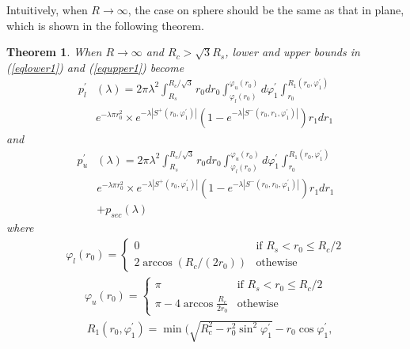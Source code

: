 \documentclass[journal, twoside]{IEEEtran}
\newtheorem{theorem}{Theorem}
\begin{document}
Intuitively, when $R \to \infty$, the case on sphere should be the same as 
that in plane, which is shown in the following theorem.

\begin{theorem} \label{theo2}
When $R \to \infty$ and $R_c > \sqrt{3}R_s$, lower and upper bounds in \emph{(\ref{eqlower1})} and \emph{(\ref{equpper1})}
become 
	\begin{equation} \label{eqlower2}
	  \begin{split}
	    p_l^\prime &(\lambda) =  2\pi\lambda ^2 \int_{R_s}^{R_c/\sqrt{3}} r_0 dr_0 \int_{\varphi_l(r_0)}^{\varphi_u(r_0)} d\varphi_1^\prime \int_{r_0}^{R_1(r_0, \varphi_1^\prime)} \\
	    	  	    & e^{-\lambda \pi r_0^2} \times e^{-\lambda |S^+(r_0, \varphi_1^\prime)|}
	    	  	    (1 - e^{-\lambda |S^-(r_0, r_1, \varphi_1^\prime)|})r_1 dr_1
	  \end{split}
	\end{equation}
	and 
	\begin{equation} \label{equpper2}
	  \begin{split}
	    p_u^\prime &(\lambda) =  2\pi\lambda ^2 \int_{R_s}^{R_c/\sqrt{3}} r_0 dr_0 \int_{\varphi_l(r_0)}^{\varphi_u(r_0)} d\varphi_1^\prime \int_{r_0}^{R_1(r_0, \varphi_1^\prime)} \\
	    	  	    & e^{-\lambda \pi r_0^2} \times e^{-\lambda |S^+(r_0, \varphi_1^\prime)|} (1 - e^{-\lambda |S^-(r_0, r_0, \varphi_1^\prime)|})r_1 dr_1\\
	    & + p_{sec}(\lambda)
	    \end{split}
	\end{equation}
	where 
	\begin{eqnarray} \label{eqphil}
	  \varphi_l(r_0) = 
	  \begin{cases}
		  0 & \text{if $R_s < r_0 \leq R_c/2$} \\
		  2\arccos(R_c /(2r_0)) & \text{othewise}
	  \end{cases}
	 \end{eqnarray}
	\begin{eqnarray} \label{eqphiu}
	 \varphi_u(r_0) = 
	 \begin{cases}
	  \pi & \text{if $R_s < r_0 \leq R_c/2$} \\
	  \pi - 4\arccos \frac{R_c}{2r_0} & \text{othewise}
	 \end{cases}
	 \end{eqnarray}
	\begin{align}
		& R_1(r_0, \varphi_1^\prime) = \min(\sqrt{R_c^2 - r_0^2\sin^2 \varphi_1^\prime} - r_0 \cos \varphi_1^\prime, \label{eqr1}\\

\end{align}
\end{theorem}
\end{document}
